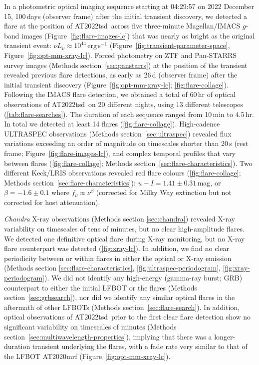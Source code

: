 \documentclass{nature_plusfigure}
\newcommand{\at}{AT2022tsd}
\begin{document}
In a photometric optical imaging sequence starting at 04:29:57 on 2022 December 15, 100\,days (observer frame) after the initial transient discovery, we detected\cite{Ho2022_Astronote_Flares} a flare at the position of \at\ across five three-minute Magellan/IMACS $g$-band images (Figure~\ref{fig:flare-images-lc}) that was nearly as bright as the original transient event: $\nu L_\nu \approx 10^{44}\,$erg\,s$^{-1}$ (Figure~\ref{fig:transient-parameter-space}, Figure~\ref{fig:opt-mm-xray-lc}).
Forced photometry on ZTF and Pan-STARRS survey images (Methods section~\ref{sec:panstarrs}) at the position of the transient revealed previous flare detections, as early as 26\,d (observer frame) after the initial transient discovery (Figure~\ref{fig:opt-mm-xray-lc}; \ref{fig:flare-collage}).
Following the IMACS flare detection, we obtained a total of 60\,hr of optical observations of \at\ on 20 different nights, using 13 different telescopes (\ref{tab:flare-searches}). The duration of each sequence ranged from 10\,min to 4.5\,hr. In total we detected at least 14 flares (\ref{fig:flare-collage}). High-cadence ULTRASPEC observations (Methods section~\ref{sec:ultraspec}) revealed flux variations exceeding an order of magnitude on timescales shorter than 20\,s (rest frame; Figure~\ref{fig:flare-images-lc}), and complex temporal profiles that vary between flares (\ref{fig:flare-collage}; Methods section~\ref{sec:flare-characteristics}).
Two different Keck/LRIS observations revealed red flare colours (\ref{fig:flare-collage}; Methods section~\ref{sec:flare-characteristics}):
$u-I=1.41\pm0.31\,$mag, or $\beta=-1.6\pm0.1$ where
$f_\nu \propto \nu^{\beta}$ (corrected for Milky Way extinction but not corrected for host attenuation).

\emph{Chandra} X-ray observations\cite{Matthews2022} (Methods section \ref{sec:chandra}) revealed X-ray variability on timescales of tens of minutes, but no clear high-amplitude flares. 
We detected one definitive optical flare during X-ray monitoring, but no X-ray flare counterpart was detected (\ref{fig:xray-lc}).
In addition, we find no clear periodicity between or within flares in either the optical or X-ray emission (Methods section \ref{sec:flare-characteristics}, \ref{fig:ultraspec-periodogram}, \ref{fig:xray-periodogram}).
We did not identify any high-energy (gamma-ray burst; GRB) counterpart to either the initial LFBOT or the flares (Methods section~\ref{sec:grbsearch}), nor did we identify any similar optical flares in the aftermath of other LFBOTs (Methods section~\ref{sec:flare-search}).
In addition, optical observations of \at\ prior to the first clear flare detection show no significant variability on timescales of minutes (Methods section~\ref{sec:multiwavelength-properties}), implying that there was a longer-duration transient underlying the flares, with a fade rate very similar to that of the LFBOT AT2020mrf\cite{Yao2022} (Figure~\ref{fig:opt-mm-xray-lc}).
\end{document}
